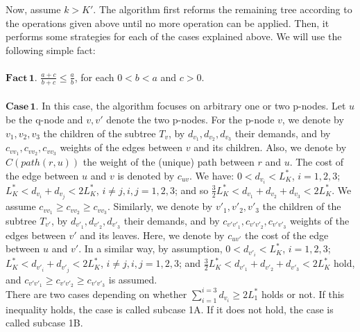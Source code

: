  \indent Now, assume $k >K'$. The algorithm first reforms the remaining tree according to the operations given above until no more operation can be applied. Then, it performs some strategies for each of the cases explained above. We will use the following simple fact:\\
 \\
$\mathbf{Fact \, 1}$. $\frac{a+c}{b+c} \le \frac{a}{b}$, for each $0<b<a$ and $c>0$.\\
 \\
\indent $\mathbf{Case \,1.}$ In this case, the algorithm focuses on arbitrary one or two p-nodes. Let $u$ be the q-node and $v,v'$ denote the two p-nodes. For the p-node $v$, we denote by $v_1, v_2, v_3$ the children of the subtree $T_{v}$, by $d_{v_1}, d_{v_2}, d_{v_3}$ their demands, and by $c_{vv_1}, c_{vv_2}, c_{vv_3}$ weights of the edges between $v$ and its children. Also, we denote by $C(path(r,u))$ the weight of the (unique) path between $r$ and $u$. The cost of the edge between $u$ and $v$ is denoted by $c_{uv}$. We have: $0 < d_{v_i}< L_K^*$, $i=1, 2, 3$; $L_K^*< d_{v_i}+d_{v_j} < 2L_K^*$, $i \neq j, i,j=1,2,3$; and so $\frac{3}{2} L_K^*< d_{v_1}+d_{v_2}+d_{v_3} < 2L_K^*$. We assume $c_{vv_1} \ge c_{vv_2} \ge c_{vv_3}$. Similarly, we denote by $v'_1, v'_2, v'_3$ the children of the subtree $T_{v'}$, by $d_{v'_1}, d_{v'_2}, d_{v'_3}$ their demands, and by $c_{v'v'_1}, c_{v'v'_2}, c_{v'v'_3}$ weights of the edges between $v'$ and its leaves. Here, we denote by $c_{uv'}$ the cost of the edge between $u$ and $v'$. In a similar way, by assumption, $0 < d_{v'_i}< L_K^*$, $i=1, 2, 3$; $L_K^* < d_{v'_i}+d_{v'_j} < 2L_K^*$, $i \neq j, i,j=1,2,3$; and $\frac{3}{2} L_K^*< d_{v'_1}+d_{v'_2}+d_{v'_3} < 2L_K^*$ hold, and $c_{v'v'_1} \ge c_{v'v'_2} \ge c_{v'v'_3}$ is assumed. \\

\indent There are two cases depending on whether $\sum_{i=1}^{i=3} d_{v_i} \ge 2L_1^*$ holds or not. If this inequality holds, the case is called subcase 1A. If it does not hold, the case is called subcase 1B.\\

